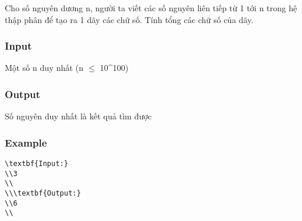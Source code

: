 



   Cho số nguyên dương n, người ta viết các số nguyên liên tiếp từ 1 tới n trong hệ thập phân để tạo ra 1 dãy các chữ số. Tính tổng các chữ số của dãy.  

\subsubsection{   Input  }

   Một số n duy nhất (n  $\le$  10^100)  

\subsubsection{   Output  }

   Số nguyên duy nhất là kết quả tìm được  

\subsubsection{   Example  }
\begin{verbatim}
\textbf{Input:}
\\3
\\
\\\textbf{Output:}
\\6
\\\end{verbatim}
